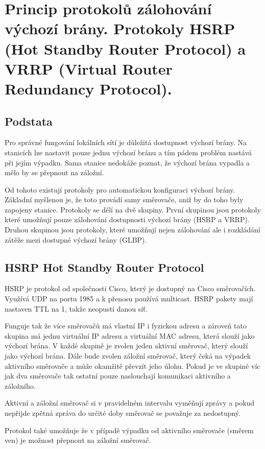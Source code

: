 \clearpage
\section{Princip protokolů zálohování výchozí brány. Protokoly HSRP (Hot Standby Router Protocol) a VRRP (Virtual Router Redundancy Protocol).}

\subsection{Podstata}

Pro správné fungování lokálních sítí je důležitá dostupnost výchozí brány.
Na stanicích lze nastavit pouze jednu výchozí bránu a tím pádem problém nastává při jejím výpadku.
Sama stanice nedokáže poznat, že výchozí brána vypadla a mělo by se přepnout na záložní.

Od tohoto existují protokoly pro automatickou konfiguraci výchozí brány.
Základní myšlenou je, že toto provádí samy směrovače, aniž by do toho byly zapojeny stanice.
Protokoly se dělí na dvě skupiny.
První skupinou jsou protokoly které umožňují pouze zálohování dostupnosti výchozí brány (HSRP a VRRP).
Druhou skupinou jsou protokoly, které umožňují nejen zálohování ale i rozkládání zátěže mezi dostupné výchozí brány (GLBP).

\subsection{HSRP Hot Standby Router Protocol}

HSRP je protokol od společnosti Cisco, který je dostupný na Cisco směrovačích.
Využívá UDP na portu 1985 a k přenosu používá multicast.
HSRP pakety mají nastaven TTL na 1, takže neopustí danou síť.

Funguje tak že více směrovačů má vlastní IP i fyzickou adresu a zároveň tato skupina má jednu virtuální IP adresu a virtuální MAC adresu, která slouží jako výchozí brána.
V každé skupině je zvolen jeden aktivní směrovač, který slouží jako výchozí brána.
Dále bude zvolen záložní směrovač, který čeká na výpadek aktivního směrovače a může okamžitě převzít jeho úlohu.
Pokud je ve skupině víc jak dva směrovače tak ostatní pouze naslouchají komunikaci aktivního a záložního.

Aktivní a záložní směrovač si v pravidelném intervalu vyměňují zprávy a pokud nepřijde zpětná zpráva do určité doby směrovač se považuje za nedostupný.

Protokol také umožňuje že v případě výpadku od aktivního směrovače (směrem ven) je možnost přepnout na záložní směrovač.

